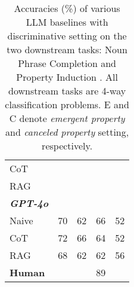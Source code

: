 \begin{table}[t!]
{\begin{tabular}{lcccc}
CoT                         &                                     &                                            &                                       & \textbf{}                                    \\
RAG                           &                                     & \textbf{}                                  &                                       & \textbf{}                                    \\\midrule
\textit{\textbf{GPT-4o}}        &                                     &                                            &                                       &                                              \\
Naive                       & 70                                  & 62                                         & 66                                    & 52                                           \\
CoT                         & 72                                  & 66                                         & 64                                    & 52                                           \\
RAG                           & 68                                  & 62                                         & 62                                    & 56                                           \\\midrule
\textbf{Human}                  &                                     &                                            & 89                                    &                                              \\ \bottomrule
\end{tabular}
}
\vspace{-3mm}
\caption{Accuracies (\%) of various LLM baselines with discriminative setting on the two downstream tasks: Noun Phrase Completion and Property Induction . All downstream tasks are 4-way classification problems. E and C denote \textit{emergent property} and \textit{canceled property} setting, respectively.}
\vspace{-3mm}
\label{table:cls_result}
\end{table}